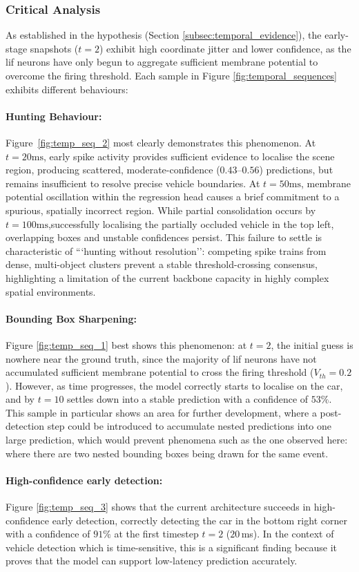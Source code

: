 \subsubsection*{Critical Analysis}
As established in the hypothesis (Section \ref{subsec:temporal_evidence}), the early-stage snapshots ($t=2$) exhibit high coordinate jitter and lower confidence, as the \gls{lif} neurons have only begun to aggregate sufficient membrane potential to overcome the firing threshold.
Each sample in Figure \ref{fig:temporal_sequences} exhibits different behaviours:

\paragraph{Hunting Behaviour:}
Figure~\ref{fig:temp_seq_2} most clearly demonstrates this phenomenon. At $t=20\text{ms}$, early
spike activity provides sufficient evidence to localise the scene region, producing scattered,
moderate-confidence ($0.43$--$0.56$) predictions, but remains insufficient to resolve precise
vehicle boundaries. At $t=50\text{ms}$, membrane potential oscillation within the regression head
causes a brief commitment to a spurious, spatially incorrect region. While partial consolidation
occurs by $t=100\text{ms}$,successfully localising the partially occluded vehicle in the top
left, overlapping boxes and unstable confidences persist. This failure to settle is
characteristic of ```hunting without resolution'': competing spike trains from dense, multi-object
clusters prevent a stable threshold-crossing consensus, highlighting a limitation of the current
backbone capacity in highly complex spatial environments.

\paragraph{Bounding Box Sharpening:}
Figure \ref{fig:temp_seq_1} best shows this phenomenon: at $t=2$, the initial guess is nowhere near the ground truth, since the majority 
of \gls{lif} neurons have not accumulated sufficient membrane potential to cross the firing threshold ($V_{th} = 0.2$).
However, as time progresses, the model correctly starts to localise on the car, and by $t=10$ settles down into a stable prediction with a confidence of $53\%$.
This sample in particular shows an area for further development, where a post-detection step could be introduced to accumulate nested predictions into one large prediction, which would prevent phenomena such as the one observed here: where there are two nested bounding boxes being drawn for the same event.

\paragraph{High-confidence early detection:}
Figure \ref{fig:temp_seq_3} shows that the current architecture succeeds in high-confidence early detection,
correctly detecting the car in the bottom right corner with a confidence of $91\%$ at the first timestep $t=2$ ($20$\,ms).
In the context of vehicle detection which is time-sensitive, this is a significant finding because it proves that the model can support low-latency prediction accurately.
